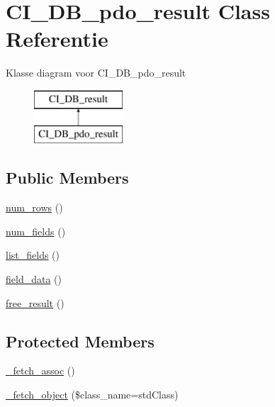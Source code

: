 \hypertarget{class_c_i___d_b__pdo__result}{}\section{C\+I\+\_\+\+D\+B\+\_\+pdo\+\_\+result Class Referentie}
\label{class_c_i___d_b__pdo__result}
Klasse diagram voor C\+I\+\_\+\+D\+B\+\_\+pdo\+\_\+result\begin{figure}[H]
\begin{center}
\leavevmode
\includegraphics[height=2.000000cm]{class_c_i___d_b__pdo__result}
\end{center}
\end{figure}
\subsection*{Public Members}
\begin{DoxyCompactItemize}
\item 
\mbox{\hyperlink{class_c_i___d_b__pdo__result_a218657c303ee499b97710ab0cd2f5d6e}{num\+\_\+rows}} ()
\item 
\mbox{\hyperlink{class_c_i___d_b__pdo__result_af831bf363e4d7d661a717a4932af449d}{num\+\_\+fields}} ()
\item 
\mbox{\hyperlink{class_c_i___d_b__pdo__result_a50b54eb4ea7cfd039740f532988ea776}{list\+\_\+fields}} ()
\item 
\mbox{\hyperlink{class_c_i___d_b__pdo__result_a84bffd65e53902ade1591716749a33e3}{field\+\_\+data}} ()
\item 
\mbox{\hyperlink{class_c_i___d_b__pdo__result_aad2d98d6beb3d6095405356c6107b473}{free\+\_\+result}} ()
\end{DoxyCompactItemize}
\subsection*{Protected Members}
\begin{DoxyCompactItemize}
\item 
\mbox{\hyperlink{class_c_i___d_b__pdo__result_a43a9a92817f1334a1c10752ec44275a0}{\+\_\+fetch\+\_\+assoc}} ()
\item 
\mbox{\hyperlink{class_c_i___d_b__pdo__result_a60806be6a9c2488820813c2a7f4fef71}{\+\_\+fetch\+\_\+object}} (\$class\+\_\+name=\textquotesingle{}std\+Class\textquotesingle{})
\end{DoxyCompactItemize}
